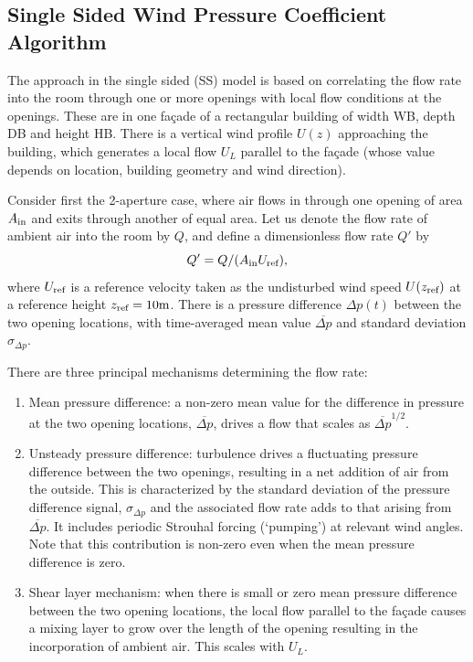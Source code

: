 \subsection{Single Sided Wind Pressure Coefficient Algorithm}

The approach in the single sided (SS) model is based on correlating the flow rate into
the room through one or more openings with local flow conditions at the openings. These
are in one fa\c{c}ade of a rectangular building of width WB, depth DB and height HB.
There is a vertical wind profile $U(z)$ approaching the building, which generates a
local flow $U_L$ parallel to the fa\c{c}ade (whose value depends on location, building
geometry and wind direction).

Consider first the 2-aperture case, where air flows in through one opening of area
$A_\textup{in}$ and exits through another of equal area. Let us denote the flow rate
of ambient air into the room by $Q$, and define a dimensionless flow rate $Q'$ by
\begin{equation}
Q'=Q/(A_\textup{in} U_\textup{ref}),
\end{equation}
where $U_\textup{ref}$ is a reference velocity taken as the undisturbed wind speed
$U(z_\textup{ref})$ at a reference height $z_\textup{ref} = 10 \textup{m}$. There is a
pressure difference $\Delta p(t)$ between the two opening locations, with time-averaged
mean value $\overline{\Delta p}$ and standard deviation $\sigma_{\Delta p}$.

There are three principal mechanisms determining the flow rate:

\begin{enumerate}[label=(\alph*)]
\item Mean pressure difference:  a non-zero mean value for the difference in pressure
at the two opening locations, $\overline{\Delta p}$, drives a flow that scales as
$\overline{\Delta p}^{1/2}$.\label{ss-mean-mech}
\item Unsteady pressure difference: turbulence drives a fluctuating pressure difference
between the two openings, resulting in a net addition of air from the outside. This is
characterized by the standard deviation of the pressure difference signal,
$\sigma_{\Delta p}$ and the associated flow rate adds to that arising from
$\overline{\Delta p}$. It includes periodic Strouhal forcing (`pumping') at relevant
wind angles. Note that this contribution is non-zero even when the mean pressure
difference is zero.\label{ss-unsteady-mech}
\item Shear layer mechanism: when there is small or zero mean pressure difference
between the two opening locations, the local flow parallel to the fa\c{c}ade causes a
mixing layer to grow over the length of the opening resulting in the incorporation of
ambient air. This scales with $U_L$.\label{ss-shear-mech}
\end{enumerate}

